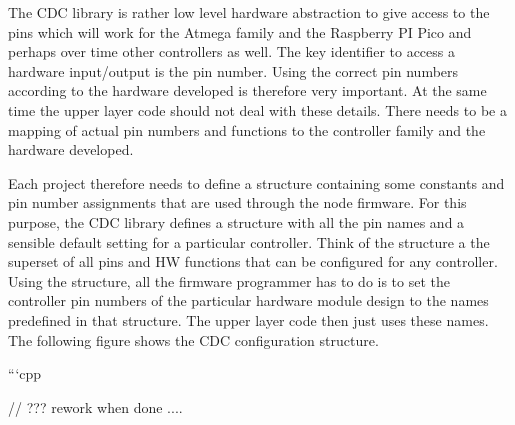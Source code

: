 The CDC library is rather low level hardware abstraction to give access to the pins which will work for the Atmega family and the Raspberry PI Pico and perhaps over time other controllers as well. The key identifier to access a hardware input/output is the pin number. Using the correct pin numbers according to the hardware developed is therefore very important. At the same time the upper layer code should not deal with these details. There needs to be a mapping of actual pin numbers and functions to the controller family and the hardware developed.

Each project therefore needs to define a structure containing some constants and pin number assignments that are used through the node firmware. For this purpose, the CDC library defines a structure with all the pin names and a sensible default setting for a particular controller. Think of the structure a the superset of all pins and HW functions that can be configured for any controller. Using the structure, all the firmware programmer has to do is to set the controller pin numbers of the particular hardware module design to the names predefined in that structure. The upper layer code then just uses these names. The following figure shows the CDC configuration structure.

```cpp

// ??? rework when done ....

